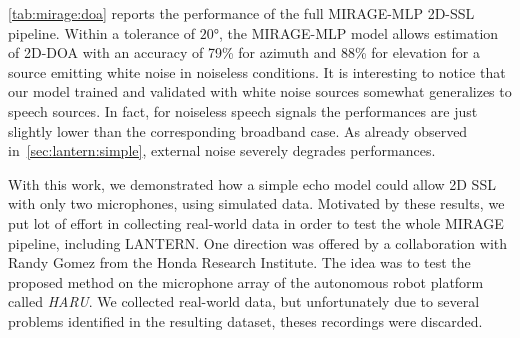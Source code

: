 \cref{tab:mirage:doa} reports the performance of the full MIRAGE-MLP 2D-SSL pipeline.
Within a tolerance of $\ang{20}$, the MIRAGE-MLP model allows estimation of 2D-\ac{DOA} with an accuracy of 79\% for azimuth and 88\% for elevation for a source emitting white noise in noiseless conditions.
It is interesting to notice that our model trained and validated with white noise sources somewhat generalizes to speech sources.
In fact, for noiseless speech signals the performances are just slightly lower than the corresponding broadband case.
As already observed in~\cref{sec:lantern:simple}, external noise severely degrades performances.

\mynewline
With this work, we demonstrated how a simple echo model could allow 2D SSL with only two microphones, using simulated data.
Motivated by these results, we put lot of effort in collecting real-world data in order to test the whole \ac{MIRAGE} pipeline, including \ac{LANTERN}.
One direction was offered by a collaboration with Randy Gomez from the Honda Research Institute.
The idea was to test the proposed method on the microphone array of the autonomous robot platform called \textit{HARU}.
We collected real-world data, but unfortunately due to several problems identified in the resulting dataset, theses recordings were discarded.




